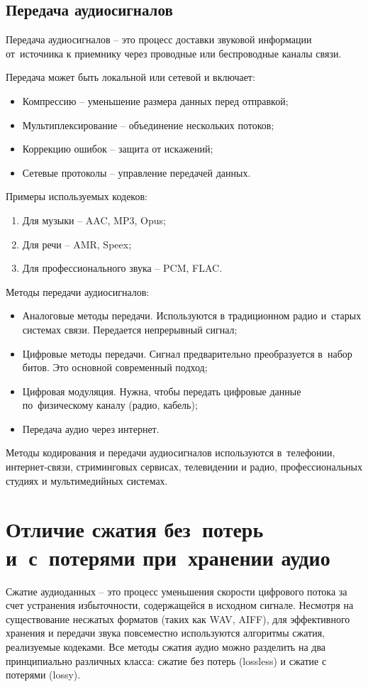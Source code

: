 \documentclass{ou}
\begin{document}
\subsection{Передача аудиосигналов}
Передача аудиосигналов -- это процесс доставки звуковой информации от~источника к приемнику через проводные или беспроводные каналы связи.

Передача может быть локальной или сетевой и включает:
\begin{itemize}[label=-, leftmargin=0em, itemindent=3.35em, nosep]
\item Компрессию -- уменьшение размера данных перед отправкой;
\item Мультиплексирование -- объединение нескольких потоков;
\item Коррекцию ошибок -- защита от искажений;
\item Сетевые протоколы -- управление передачей данных.
\end{itemize}

Примеры используемых кодеков:
\begin{enumerate}[leftmargin=0em, itemindent=3.75em, nosep, label=\arabic*)]
\item Для музыки -- AAC, MP3, Opus;
\item Для речи -- AMR, Speex;
\item Для профессионального звука -- PCM, FLAC.
\end{enumerate}

Методы передачи аудиосигналов:
\begin{itemize}[label=-, leftmargin=0em, itemindent=3.35em, nosep]
\item Аналоговые методы передачи. Используются в традиционном радио и~старых системах связи. Передается непрерывный сигнал;
\item Цифровые методы передачи. Сигнал предварительно преобразуется в~набор битов. Это основной современный подход;
\item Цифровая модуляция. Нужна, чтобы передать цифровые данные по~физическому каналу (радио, кабель);
\item Передача аудио через интернет.
\end{itemize}

Методы кодирования и передачи аудиосигналов используются в~телефонии, интернет-связи, стриминговых сервисах, телевидении и радио, профессиональных студиях и мультимедийных системах.
\newpage
\section{Отличие сжатия без~потерь и~с~потерями при~хранении аудио}
Сжатие аудиоданных -- это процесс уменьшения скорости цифрового потока за счет устранения избыточности, содержащейся в исходном сигнале. Несмотря на существование несжатых форматов (таких как WAV, AIFF), для эффективного хранения и передачи звука повсеместно используются алгоритмы сжатия, реализуемые кодеками. Все методы сжатия аудио можно разделить на два принципиально различных класса: сжатие без потерь (lossless) и сжатие с потерями (lossy).
\end{document}
